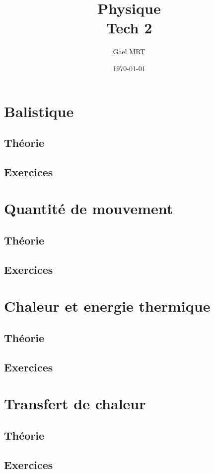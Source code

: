 \documentclass{report}
\title{Physique \\ Tech 2}
\author{Gaël MRT}
\date{\today}
\begin{document}
\maketitle

\tableofcontents
\thispagestyle{fancy}

\chapter{Balistique}
\thispagestyle{fancy}
\section{Théorie}

\section{Exercices}




\newpage
\chapter{Quantité de mouvement}
\thispagestyle{fancy}
\section{Théorie}



\section{Exercices}



\chapter{Chaleur et energie thermique}
\section{Théorie}



\section{Exercices}




\chapter{Transfert de chaleur}
\section{Théorie}



\section{Exercices}



\end{document}
